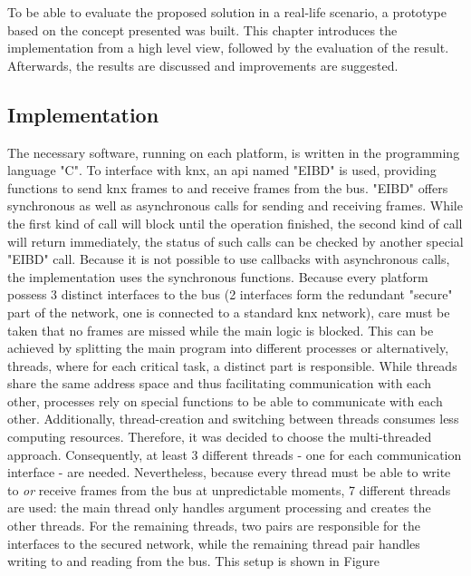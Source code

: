 \label{chap6}
To be able to evaluate the proposed solution in a real-life scenario, a prototype based on the concept presented was built. This chapter introduces the implementation from a high level
view, followed by the evaluation of the result. Afterwards, the results are discussed and improvements are suggested.
\subsection{Implementation}
The necessary software, running on each platform, is written in the programming language "C". To interface with \gls{knx}, an \gls{api} named "EIBD" is used, providing functions to
send \gls{knx} frames to and receive frames from the bus. "EIBD" offers synchronous as well as asynchronous calls for sending and receiving frames. While the first kind of
call will block until the operation finished, the second kind of call will return immediately, the status of such calls can be checked by another special "EIBD" call.
Because it is not possible to use callbacks with asynchronous calls, the implementation uses the synchronous functions. Because every platform possess 3 distinct interfaces to the bus (2 interfaces form the redundant "secure" part of the network, one is connected
to a standard \gls{knx} network), care must be taken that no frames are missed while the main logic is blocked. This can be achieved by splitting the main program into different 
processes or alternatively, threads, where for each critical task, a distinct part is responsible. While threads share the same address space and thus facilitating communication with
each other, processes rely on special functions to be able
to communicate with each other. Additionally, thread-creation and switching between threads consumes less computing resources. Therefore, it was decided to choose the multi-threaded
approach. Consequently, at least 3 different threads - one for each communication interface - are needed. Nevertheless, because every thread must be able to write to \textit{or} receive
frames from the bus at unpredictable moments, 7 different threads are used: the main thread only handles argument processing and creates the other threads. For the remaining threads,
two pairs are responsible for the interfaces to the secured network, while the remaining thread pair handles writing to and reading from the bus. This setup is shown in Figure 

